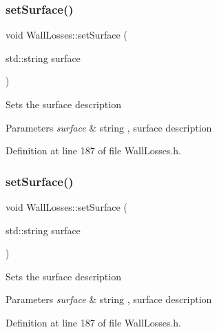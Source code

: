 \mbox{\label{class_wall_losses_af329a27b78e1f2d84af6a48ffc59bfad}} 
\subsubsection{\texorpdfstring{set\+Surface()}{setSurface()}\hspace{0.1cm}{\footnotesize\ttfamily [1/3]}}
{\footnotesize\ttfamily void Wall\+Losses\+::set\+Surface (\begin{DoxyParamCaption}\item[{std\+::string}]{surface }\end{DoxyParamCaption})\hspace{0.3cm}{\ttfamily [inline]}}

Sets the surface description 
\begin{DoxyParams}{Parameters}
{\em surface} & string , surface description \\
\hline
\end{DoxyParams}


Definition at line 187 of file Wall\+Losses.\+h.

\mbox{\label{class_wall_losses_af329a27b78e1f2d84af6a48ffc59bfad}} 
\subsubsection{\texorpdfstring{set\+Surface()}{setSurface()}\hspace{0.1cm}{\footnotesize\ttfamily [2/3]}}
{\footnotesize\ttfamily void Wall\+Losses\+::set\+Surface (\begin{DoxyParamCaption}\item[{std\+::string}]{surface }\end{DoxyParamCaption})\hspace{0.3cm}{\ttfamily [inline]}}

Sets the surface description 
\begin{DoxyParams}{Parameters}
{\em surface} & string , surface description \\
\hline
\end{DoxyParams}


Definition at line 187 of file Wall\+Losses.\+h.

